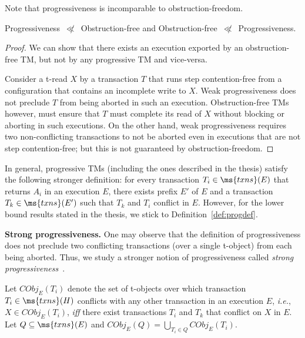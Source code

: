 Note that progressiveness is incomparable to obstruction-freedom.
\begin{observation}
Progressiveness~$\not\ll$~Obstruction-free and Obstruction-free~$\not\ll$~Progressiveness.
\end{observation}
\begin{proof}
We can show that there exists an execution exported by an obstruction-free TM, but not by any
progressive TM and vice-versa.

Consider a t-read $X$ by a transaction $T$ that runs step contention-free
from a configuration that contains an incomplete write to $X$. Weak progressiveness
does not preclude $T$ from being aborted in such an execution.
Obstruction-free TMs however, must ensure that $T$ must complete its read of $X$ without blocking or aborting in such executions.
On the other hand, weak progressiveness requires two non-conflicting transactions to not be aborted even
in executions that are not step contention-free; but this is not guaranteed by obstruction-freedom.
\end{proof}
In general, progressive TMs (including the ones described in the thesis) satisfy the following stronger definition: 
for every transaction $T_i \in \ms{txns}(E)$ that returns $A_i$ in an execution $E$, 
there exists prefix $E'$ of $E$ and a transaction $T_k \in \ms{txns}(E')$ such that $T_k$ and $T_i$
conflict in $E$. However, for the lower bound results stated in the thesis, we stick to Definition~\ref{def:progdef}.

\vspace{1mm}\noindent\textbf{Strong progressiveness.}
One may observe that the definition of progressiveness does not preclude two conflicting 
transactions (over a single t-object) from each being aborted.
Thus, we study a stronger notion of progressiveness called \emph{strong progressiveness}~\cite{tm-book}.

Let $CObj_E(T_i)$ denote the set of t-objects over which transaction $T_i \in \ms{txns}(H)$ conflicts with any other 
transaction in an execution $E$,
\emph{i.e.}, $X \in CObj_E(T_i)$, \emph{iff} there exist transactions $T_i$ and $T_k$
that conflict on $X$ in $E$.
Let $ Q\subseteq \ms{txns}(E)$ and $CObj_E(Q)=\bigcup\limits_{ T_i \in Q} CObj_E(T_i)$.

